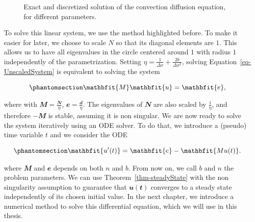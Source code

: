 \documentclass[
  letterpaper,
]{report}
\theoremstyle{definition}
\theoremstyle{plain}
\theoremstyle{definition}
\theoremstyle{remark}
\begin{document}
\begin{figure}
\begin{minipage}{0.50\linewidth}
{}


\end{minipage}%

\caption{\label{fig-th_vs_dis}Exact and discretized solution of the
convection diffusion equation, for different parameters.}

\end{figure}%

To solve this linear system, we use the method highlighted before. To
make it easier for later, we choose to scale \(N\) so that its diagonal
elements are \(1\). This allows us to have all eigenvalues in the circle
centered around \(1\) with radius \(1\) independently of the
parametrization. Setting
\(\eta = \frac{1}{\Delta x} + \frac{2b}{\Delta x^2}\), solving
Equation~\ref{eq-UnscaledSystem} is equivalent to solving the system

\begin{equation}\phantomsection\label{eq-test_problem_scaled_system}{
\mathbfit{M} \mathbfit{u} = \mathbfit{e},
}\end{equation}

where with \(\mathbfit{M} = \frac{\mathbfit{N}}{\eta}\),
\(\mathbfit{e} = \frac{\mathbfit{d}}{\eta}\). The eigenvalues of
\(\mathbfit{N}\) are also scaled by \(\frac{1}{\eta}\), and therefore
\(-\mathbfit{M}\) is stable, assuming it is non singular. We are now
ready to solve the system iteratively using an ODE solver. To do that,
we introduce a (pseudo) time variable \(t\) and we consider the ODE

\begin{equation}\phantomsection\label{eq-test_problem_diff_eq}{
\mathbfit{u'(t)} = \mathbfit{e} - \mathbfit{Mu(t)}.
}\end{equation}

where \(\mathbfit{M}\) and \(\mathbfit{e}\) depends on both \(n\) and
\(b\). From now on, we call \(b\) and \(n\) the problem parameters. We
can use Theorem~\ref{thm-steadyState} with the non singularity
assumption to guarantee that \(\mathbfit{u(t)}\) converges to a steady
state independently of its chosen initial value. In the next chapter, we
introduce a numerical method to solve this differential equation, which
we will use in this thesis.
\end{document}
